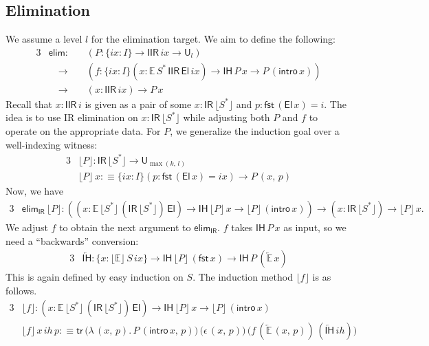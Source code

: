 \documentclass[acmsmall,screen,review]{acmart}
\newcommand{\msf}[1]{{\mathsf{#1}}}
\newcommand{\mbb}[1]{\mathbb{#1}}
\newcommand{\U}{\msf{U}}
\newcommand{\El}{\msf{El}}
\newcommand{\ix}{{ix}}
\newcommand{\IR}{\msf{IR}}
\newcommand{\ih}{{ih}}
\newcommand{\intro}{\msf{intro}}
\newcommand{\IH}{\msf{IH}}
\newcommand{\elim}{\msf{elim}}
\newcommand{\tr}{\msf{tr}}
\newcommand{\fst}{\msf{fst}}
\newcommand{\IIR}{\msf{IIR}}
\newcommand{\floord}[1]{\lfloor #1 \rfloor}
\newcommand{\ola}[1]{\overleftarrow{#1}}
\newcommand{\E}{\mbb{E}}
\begin{document}
\subsection{Elimination}\label{sec:iir-construction-elimination}

We assume a level $l$ for the elimination target. We aim to define the following:
\begin{alignat*}{3}
  &\elim :\,           &&(P : \{\ix : I\}\to \IIR\,\ix \to \U_l)\\
  &                \quad\to && (f : \{\ix : I\}(x : \E\,S^*\,\IIR\,\El\,\ix) \to \IH\,P\,x \to P\,(\intro\,x))\\
  &                \quad\to && (x : \IIR\,\ix) \to P\,x
\end{alignat*}
Recall that $x : \IIR\,i$ is given as a pair of some $x : \IR\,\floord{S^*}$ and $p :
\fst\,(\El\,x) = i$.  The idea is to use IR elimination on $x : \IR\,\floord{S^*}$ while adjusting
both $P$ and $f$ to operate on the appropriate data. For $P$, we generalize the induction goal
over a well-indexing witness:
\begin{alignat*}{3}
  &\floord{P} : \IR\,\floord{S^*} \to \U_{\max(k,\,l)} \\
  &\floord{P}\,x :\equiv \{\ix : I\}(p : \fst\,(\El\,x) = \ix) \to P\,(x,\,p)
\end{alignat*}
Now, we have
\begin{alignat*}{3}
  & \elim_\IR\,\floord{P} : ((x : \E\,\floord{S^*}\,(\IR\,\floord{S^*})\,\El) \to \IH\,\floord{P}\,x \to \floord{P}\,(\intro\,x))
       \to (x : \IR\,\floord{S^*}) \to \floord{P}\,x.
\end{alignat*}
We adjust $f$ to obtain the next argument to $\elim_\IR$. $f$ takes $\IH\,P\,x$ as input,
so we need a ``backwards'' conversion:
\begin{alignat*}{3}
  & \ola{\IH} : \{x : \floord{\E}\,S\,\ix\} \to \IH\,\floord{P}\,(\fst\,x) \to \IH\,P\,(\ola{\E}\,x)
\end{alignat*}
This is again defined by easy induction on $S$. The induction method $\floord{f}$ is as follows.
\begin{alignat*}{3}
  &\floord{f} : (x : \E\,\floord{S^*}\,(\IR\,\floord{S^*})\,\El) \to \IH\,\floord{P}\,x \to \floord{P}\,(\intro\,x)\\
  &\floord{f}\,x\,\ih\,p :\equiv \tr\,\bigl(\lambda\,(x,\,p).\,P\,(\intro\,x,\,p)\bigr)\,\bigl(\epsilon\,(x,\,p)\bigr)\,
                                      \bigl(f\,(\ola{\E}\,(x,\,p))\,(\ola{\IH}\,\ih)\bigr)
\end{alignat*}
\end{document}
